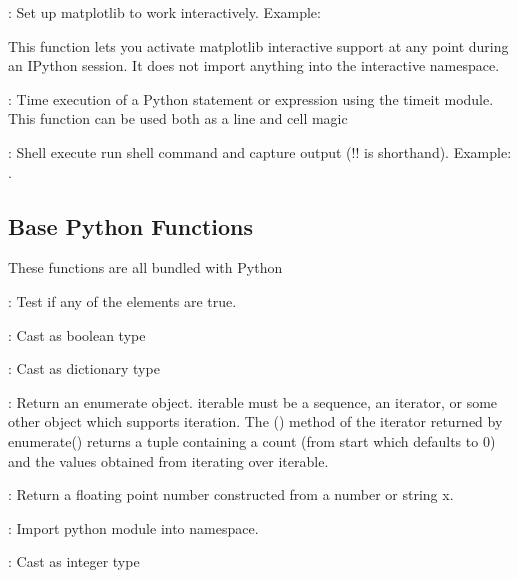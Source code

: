 \documentclass[letterpaper,10pt,english]{sphinxmanual}
\begin{document}
: Set up matplotlib to work interactively. Example: 

This function lets you activate matplotlib interactive support at any point during an IPython session. It does not import anything into the interactive namespace.

: Time execution of a Python statement or expression using the timeit module. This function can be used both as a line and cell magic

: Shell execute \sphinxhyphen{} run shell command and capture output (!! is short\sphinxhyphen{}hand). Example: .


\subsection{Base Python Functions}
\label{\detokenize{content/Glossary:base-python-functions}}
These functions are all bundled with Python

: Test if any of the elements are true.

: Cast as boolean type

: Cast as dictionary type

: Return an enumerate object. iterable must be a sequence, an iterator, or some other object which supports iteration. The () method of the iterator returned by enumerate() returns a tuple containing a count (from start which defaults to 0) and the values obtained from iterating over iterable.

: Return a floating point number constructed from a number or string x.

: Import python module into namespace.

: Cast as integer type
\end{document}
